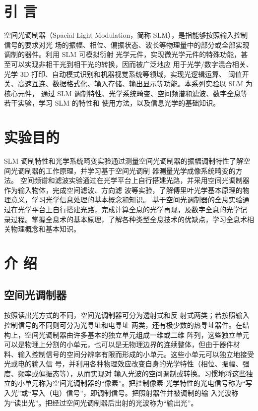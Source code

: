 \documentclass[10pt,a4paper,twoside,UTF8]{ctexart}
\begin{document}


\section{引 \quad 言}
空间光调制器（Spacial Light Modulation，简称 SLM），是指能够按照输入控制信号的要求对光
场的振幅、相位、偏振状态、波长等物理量中的部分或全部实现调制的器件。利用 SLM 可模拟衍射
光学元件，实现微光学元件的特殊功能，甚至可以实现非相干光到相干光的转换，因而被广泛地应
用于光学/数字混合相关、光学 3D 打印、自动模式识别和机器视觉系统等领域，实现光逻辑运算、
阈值开关、高速互连、数据格式化、输入存储、输出显示等功能。本系列实验以 SLM 为核心元件，
通过 SLM 调制特性、光学系统畸变、空间频谱和滤波、数字全息等若干实验，学习 SLM 的特性和
使用方法，以及信息光学的基础知识。

\section{实验目的}
SLM 调制特性和光学系统畸变实验通过测量空间光调制器的振幅调制特性了解空间光调制器的工作原理，并学习基于空间光调制
器测量光学成像系统畸变的方法。
空间频谱和滤波实验通过在光学平台上自行搭建光路，并采用空间光调制器作为输入物体，完成空间滤波、方向滤
波等实验，了解傅里叶光学基本原理的物理意义，学习光学信息处理的基本概念和知识。
基于空间光调制器的全息实验通过在光学平台上自行搭建光路，完成计算全息的光学再现，及数字全息的光学记
录过程。掌握全息术的基本原理，了解各种类型全息技术的优缺点，学习全息术相关物理概念和基本知识。

\section{介 \quad 绍\autocite{1}}
\subsection{空间光调制器}
按照读出光方式的不同，空间光调制器可分为透射式和反
射式两类；若按照输入控制信号的不同则可分为光寻址和电寻址
两类，还有极少数的热寻址器件。在结构上，空间光调制器由许多基本的独立单元组成一维或二维
阵列，这些独立单元可以是物理上分割的小单元，也可以是无物理边界的连续整体，但由于器件材
料、输入控制信号的空间分辨率有限而形成的小单元。这些小单元可以独立地接受光或电的输入信
号，并利用各种物理效应改变自身的光学特性（相位、振幅、强度、频率或偏振态等），从而实现对
输入光波的空间调制或转换。习惯地将这些独立的小单元称为空间光调制器的“像素”。把控制像素
光学特性的光电信号称为“写入光”或“写入（电）信号”，即调制信号。把照射器件并被调制的输
入光波称为“读出光”。把经过空间光调制器后出射的光波称为“输出光”。
\end{document}

